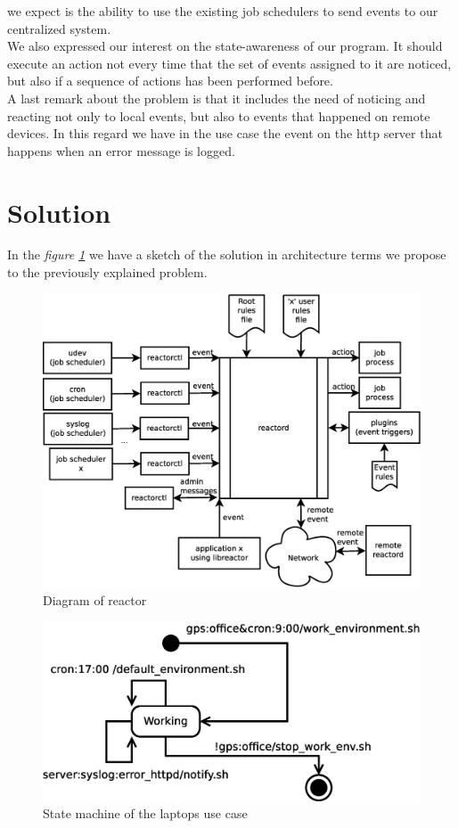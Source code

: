 we expect is the ability to use the existing job schedulers to send events to our centralized system.\\
We also expressed our interest on the state-awareness of our program. It should execute an action not every time that the set of events
assigned to it are noticed, but also if a sequence of actions has been performed before.\\
A last remark about the problem is that it includes the need of noticing and reacting not only to local events, but also to events
that happened on remote devices. In this regard we have in the use case the event on the http server that happens when an error message is
logged.
\section{Solution}
\label{sec:solution}
In the \emph{figure \ref{fig:reactordia1}} we have a sketch of the solution in architecture terms we propose to the previously explained 
problem.\\
\begin{figure}[h]
  \centering
  \includegraphics[width=\textwidth,keepaspectratio]{img/reactordia}
  \caption{Diagram of reactor}
  \label{fig:reactordia1}
\end{figure}

\begin{figure}[h]
  \centering
  \includegraphics[scale=0.5,keepaspectratio]{img/usecasesm}
  \caption{State machine of the laptops use case}
  \label{fig:usecasesm1}
\end{figure}

